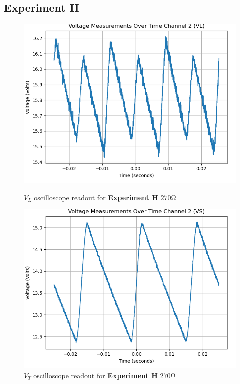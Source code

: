 \documentclass[
	letterpaper
	12pt
]{template}
\newcommand{\bref}[2]{\textbf{\hyperref[#1]{#2}}}
\begin{document}
\subsection{Experiment H}
\begin{figure}[H]\label{data::H}
	\centering
	\begin{minipage}[c]{0.45\textwidth}
		\centering
		\includegraphics[width=\textwidth]{figures/H/1--ch2.png}
	    \caption{$V_{L}$ oscilloscope readout for \bref{exp::H}{Experiment H} $270\unit{\ohm}$ }
	\end{minipage}
	\hfill
	\begin{minipage}[c]{0.45\textwidth}
		\centering
		\includegraphics[width=\textwidth]{figures/G/2--ch2.png}
	    \caption{$V_{T}$ oscilloscope readout for \bref{exp::H}{Experiment H} $270\unit{\ohm}$ }
	\end{minipage}
\end{figure}
\end{document}

